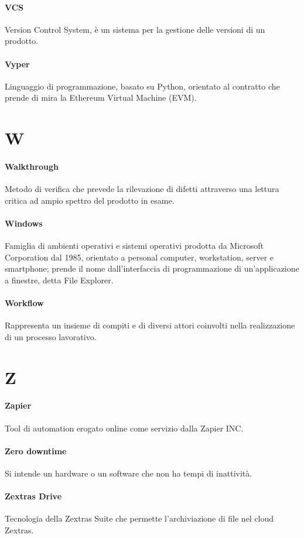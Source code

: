 \documentclass[]{article}
\begin{document}
	\paragraph*{VCS}
	Version Control System, è un sistema per la gestione delle versioni di un prodotto.
	
	\paragraph*{Vyper}
	Linguaggio di programmazione, basato su Python, orientato al contratto che prende di mira la Ethereum Virtual Machine (EVM).
	
	\newpage
	
	\section*{W}
	
	\paragraph*{Walkthrough}
	Metodo di verifica che prevede la rilevazione di difetti attraverso una lettura critica ad ampio spettro del prodotto in esame.
	
	\paragraph*{Windows}
	Famiglia di ambienti operativi e sistemi operativi prodotta da Microsoft Corporation dal 1985, orientato a personal computer, workstation, server e smartphone; prende il nome dall'interfaccia di programmazione di un'applicazione a finestre, detta File Explorer.
	
	\paragraph*{Workflow}
	Rappresenta un insieme di compiti e di diversi attori coinvolti nella realizzazione di un processo lavorativo.
	
	\newpage
	
	\section*{Z}
	
	\paragraph*{Zapier}
	Tool di automation erogato online come servizio dalla Zapier INC.
	
	\paragraph*{Zero downtime}
	Si intende un hardware o un software che non ha tempi di inattività.
	
	\paragraph*{Zextras Drive}
	Tecnologia della Zextras Suite che permette l'archiviazione di file nel cloud Zextras.
\end{document}
